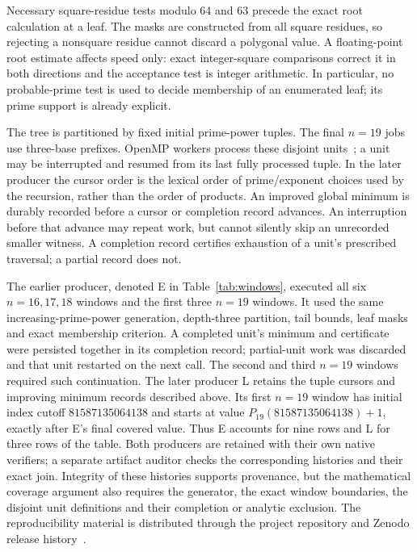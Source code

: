 \documentclass[11pt]{article}
\theoremstyle{remark}
\begin{document}
Necessary square-residue tests modulo $64$ and $63$ precede the exact root
calculation at a leaf. The masks are constructed from all square residues,
so rejecting a nonsquare residue cannot discard a polygonal value. A
floating-point root estimate affects speed only: exact integer-square
comparisons correct it in both directions and the acceptance test is integer
arithmetic. In particular, no probable-prime test is used to decide membership
of an enumerated leaf; its prime support is already explicit.

The tree is partitioned by fixed initial prime-power tuples. The final
$n=19$ jobs use three-base prefixes. OpenMP workers process these disjoint
units~\cite{gcc}; a unit may be interrupted and resumed from its last fully
processed tuple. In the later producer the cursor order is the lexical
order of prime/exponent choices used by the recursion, rather than the order
of products. An improved global minimum is durably recorded before a cursor
or completion record advances. An interruption before that advance may
repeat work, but cannot silently skip an unrecorded smaller witness. A
completion record certifies exhaustion of a unit's prescribed traversal;
a partial record does not.

The earlier producer, denoted E in Table~\ref{tab:windows}, executed all
six $n=16,17,18$ windows and the first three $n=19$ windows. It used the
same increasing-prime-power generation, depth-three partition, tail bounds,
leaf masks and exact membership criterion. A completed unit's minimum and
certificate were persisted together in its completion record; partial-unit
work was discarded and that unit restarted on the next call. The second
and third $n=19$ windows required such continuation. The later producer L
retains the tuple cursors and improving minimum records described above.
Its first $n=19$ window has initial index cutoff $81587135064138$ and starts
at value $P_{19}(81587135064138)+1$, exactly after E's final covered value.
Thus E accounts for nine rows and L for three rows of the table.
Both producers are retained with their own native verifiers; a separate
artifact auditor checks the corresponding histories and their exact join.
Integrity of these histories supports provenance, but the mathematical
coverage argument also requires the generator, the exact window boundaries,
the disjoint unit definitions and their completion or analytic exclusion.
The reproducibility material is distributed through the project repository
and Zenodo release history~\cite{corti}.
\end{document}
